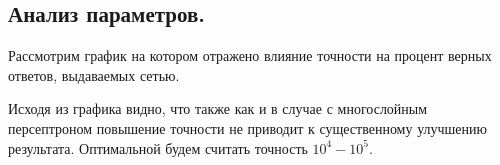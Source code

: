 \subsection{Анализ параметров.}
Рассмотрим график на котором отражено влияние точности на процент верных ответов, выдаваемых сетью.
\begin{figure}[H]
\end{figure}
Исходя из графика видно, что также как и в случае с многослойным персептроном повышение точности не приводит к существенному улучшению результата. Оптимальной будем считать точность $10^4-10^5$.
